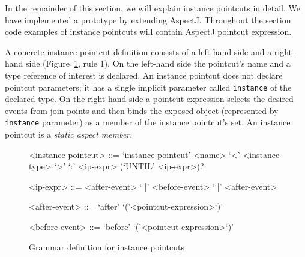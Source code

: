 \documentclass{acm_proc_article-sp}
\newcommand{\todok}[1]{\textcolor{red}{\textbf{#1}}}
\newcommand{\lstinln}[1]{\lstinline~#1~}
\begin{document}
In the remainder of this section, we will explain instance pointcuts in detail. We have implemented a prototype by extending AspectJ. Throughout the section code examples of instance pointcuts will contain AspectJ pointcut expression.



A concrete instance pointcut definition consists of a left hand-side and a right-hand side (Figure~\ref{fig:grammar1}, rule 1). 
On the left-hand side the pointcut's name and a type reference of interest is declared. 
An instance pointcut does not declare pointcut parameters; it has a single implicit parameter called \lstinln{instance} of the declared type. 
On the right-hand side a pointcut expression selects the desired events from join points and then binds the exposed object (represented by \lstinln{instance} parameter) as a member of the instance pointcut's set. 
An instance pointcut is a \emph{static aspect member}. %

\begin{figure}[h!]
\begin{grammar}
<instance pointcut> ::= `instance pointcut' <name> `<' <instance-type> `>' `:'
<ip-expr> (`UNTIL' <ip-expr>)? 

<ip-expr> ::= <after-event> `||' <before-event>  `||' <after-event>  

<after-event> ::= `after' `('<pointcut-expression>`)'

<before-event> ::= `before' `('<pointcut-expression>`)'
\end{grammar}
\caption{Grammar definition for instance pointcuts}
\label{fig:grammar1}
\end{figure}

\end{document}
